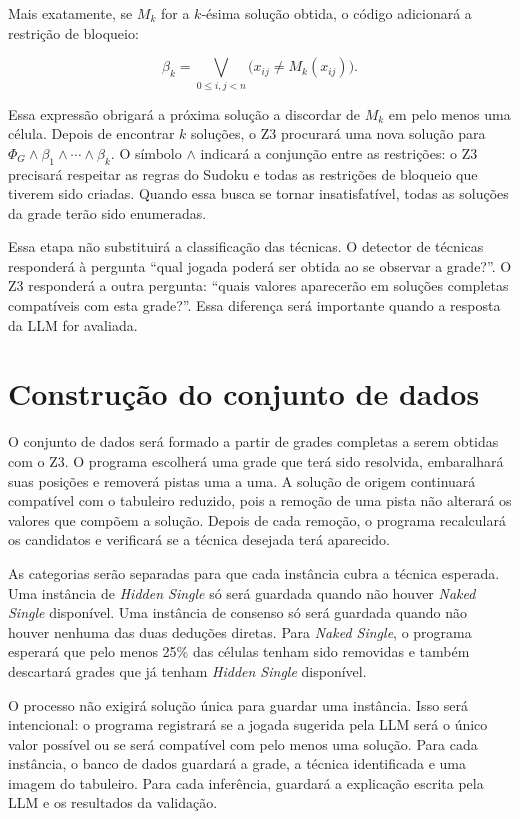 Mais exatamente, se $M_k$ for a $k$-ésima solução obtida, o código adicionará a restrição de bloqueio:

\[
\beta_k=\bigvee_{0\leq i,j<n}\bigl(x_{ij}\neq M_k(x_{ij})\bigr).
\]

Essa expressão obrigará a próxima solução a discordar de $M_k$ em pelo menos uma célula. Depois de encontrar $k$ soluções, o Z3 procurará uma nova solução para $\Phi_G\land\beta_1\land\cdots\land\beta_k$. O símbolo $\land$ indicará a conjunção entre as restrições: o Z3 precisará respeitar as regras do Sudoku e todas as restrições de bloqueio que tiverem sido criadas. Quando essa busca se tornar insatisfatível, todas as soluções da grade terão sido enumeradas.

Essa etapa não substituirá a classificação das técnicas. O detector de técnicas responderá à pergunta ``qual jogada poderá ser obtida ao se observar a grade?''. O Z3 responderá a outra pergunta: ``quais valores aparecerão em soluções completas compatíveis com esta grade?''. Essa diferença será importante quando a resposta da LLM for avaliada.

\section{Construção do conjunto de dados}

O conjunto de dados será formado a partir de grades completas a serem obtidas com o Z3. O programa escolherá uma grade que terá sido resolvida, embaralhará suas posições e removerá pistas uma a uma. A solução de origem continuará compatível com o tabuleiro reduzido, pois a remoção de uma pista não alterará os valores que compõem a solução. Depois de cada remoção, o programa recalculará os candidatos e verificará se a técnica desejada terá aparecido.

As categorias serão separadas para que cada instância cubra a técnica esperada. Uma instância de \textit{Hidden Single} só será guardada quando não houver \textit{Naked Single} disponível. Uma instância de consenso só será guardada quando não houver nenhuma das duas deduções diretas. Para \textit{Naked Single}, o programa esperará que pelo menos 25\% das células tenham sido removidas e também descartará grades que já tenham \textit{Hidden Single} disponível.

O processo não exigirá solução única para guardar uma instância. Isso será intencional: o programa registrará se a jogada sugerida pela LLM será o único valor possível ou se será compatível com pelo menos uma solução. Para cada instância, o banco de dados guardará a grade, a técnica identificada e uma imagem do tabuleiro. Para cada inferência, guardará a explicação escrita pela LLM e os resultados da validação.

